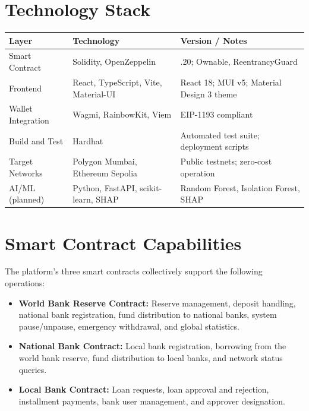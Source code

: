 \documentclass[11pt,a4paper]{article}
\newcommand{\tableheadfont}{\bfseries\small\color{PrimaryBlue}}
\newenvironment{moderntable}[1][H]{%
    \begin{table}[#1]\centering\small%
    \renewcommand{\arraystretch}{1.35}%
}{%
    \end{table}%
}
\begin{document}
\appendix

\section{Technology Stack}

\begin{moderntable}
\begin{tabular}{@{} >{\raggedright}p{3cm} >{\raggedright}p{4.5cm} >{\raggedright\arraybackslash}p{4.5cm} @{}}
\toprule
\tableheadfont Layer & \tableheadfont Technology & \tableheadfont Version / Notes \\
\midrule
\rowcolor{RowShade}
Smart Contract & Solidity, OpenZeppelin & 0.8.20; Ownable, ReentrancyGuard \\
Frontend & React, TypeScript, Vite, Material-UI & React 18; MUI v5; Material Design 3 theme \\
\rowcolor{RowShade}
Wallet Integration & Wagmi, RainbowKit, Viem & EIP-1193 compliant \\
Build and Test & Hardhat & Automated test suite; deployment scripts \\
\rowcolor{RowShade}
Target Networks & Polygon Mumbai, Ethereum Sepolia & Public testnets; zero-cost operation \\
AI/ML (planned) & Python, FastAPI, scikit-learn, SHAP & Random Forest, Isolation Forest, SHAP \\
\bottomrule
\end{tabular}
\end{moderntable}

\section{Smart Contract Capabilities}

The platform's three smart contracts collectively support the following operations:

\begin{itemize}[noitemsep]
\item \textbf{World Bank Reserve Contract:} Reserve management, deposit handling, national bank registration, fund distribution to national banks, system pause/unpause, emergency withdrawal, and global statistics.
\item \textbf{National Bank Contract:} Local bank registration, borrowing from the world bank reserve, fund distribution to local banks, and network status queries.
\item \textbf{Local Bank Contract:} Loan requests, loan approval and rejection, installment payments, bank user management, and approver designation.
\end{itemize}
\end{document}
